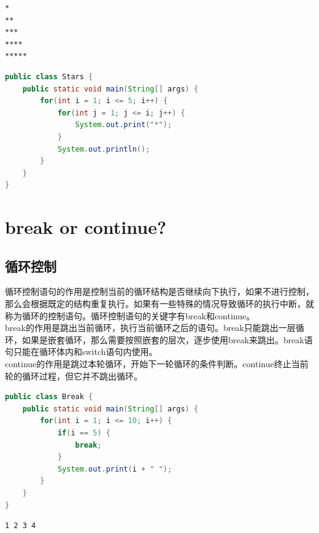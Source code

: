 
\begin{lstlisting}
*
**
***
****
*****
\end{lstlisting}

\begin{lstlisting}[language=Java]
public class Stars {
    public static void main(String[] args) {
        for(int i = 1; i <= 5; i++) {
            for(int j = 1; j <= i; j++) {
                System.out.print("*");
            }
            System.out.println();
        }
    }
}
\end{lstlisting}

\newpage

\section{break or continue?}

\subsection{循环控制}

循环控制语句的作用是控制当前的循环结构是否继续向下执行，如果不进行控制，那么会根据既定的结构重复执行。如果有一些特殊的情况导致循环的执行中断，就称为循环的控制语句。循环控制语句的关键字有break和continue。 \\

break的作用是跳出当前循环，执行当前循环之后的语句。break只能跳出一层循环，如果是嵌套循环，那么需要按照嵌套的层次，逐步使用break来跳出。break语句只能在循环体内和switch语句内使用。 \\

continue的作用是跳过本轮循环，开始下一轮循环的条件判断。continue终止当前轮的循环过程，但它并不跳出循环。 \\


\begin{lstlisting}[language=Java]
public class Break {
    public static void main(String[] args) {
        for(int i = 1; i <= 10; i++) {
            if(i == 5) {
                break;
            }
            System.out.print(i + " ");
        }
    }
}
\end{lstlisting}

\begin{tcolorbox}
	\begin{verbatim}
1 2 3 4
    \end{verbatim}
\end{tcolorbox}

